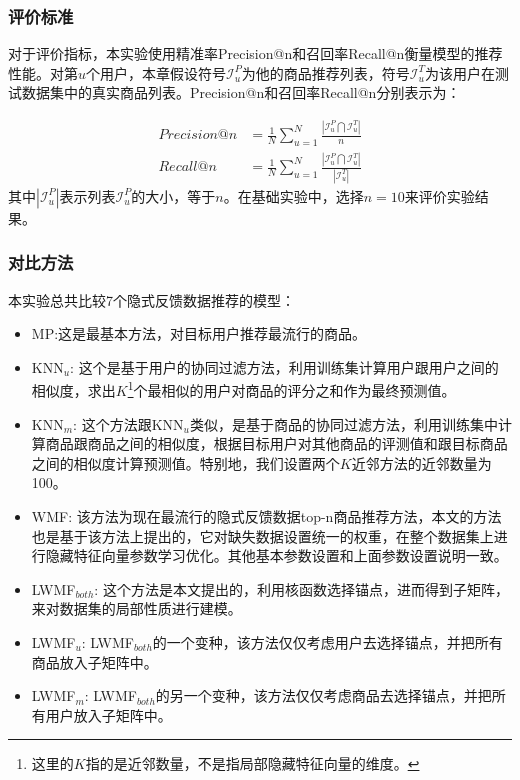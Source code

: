 \subsubsection{评价标准}
对于评价指标，本实验使用精准率Precision@n和召回率Recall@n衡量模型的推荐性能。对第$u$个用户，本章假设符号$\mathcal{I}^P_u$为他的商品推荐列表，符号$\mathcal{I}^T_u$为该用户在测试数据集中的真实商品列表。Precision@n和召回率Recall@n分别表示为：

\begin{align}
Precision@n &= \frac{1}{N}\sum_{u=1}^{N}\frac{|\mathcal{I}^P_u\bigcap \mathcal{I}^T_u|}{n}\\
Recall@n &= \frac{1}{N}\sum_{u=1}^{N}\frac{|\mathcal{I}^P_u\bigcap \mathcal{I}^T_u|}{|\mathcal{I}^T_u|}
\end{align}
其中$|\mathcal{I}^P_u|$表示列表$\mathcal{I}^P_u$的大小，等于$n$。在基础实验中，选择$n=10$来评价实验结果。

\subsubsection{对比方法}
本实验总共比较7个隐式反馈数据推荐的模型：
\begin{itemize}
	\item MP:这是最基本方法，对目标用户推荐最流行的商品。 
	\item KNN$_u$: 这个是基于用户的协同过滤方法，利用训练集计算用户跟用户之间的相似度，求出$K$\footnote{这里的$K$指的是近邻数量，不是指局部隐藏特征向量的维度。}个最相似的用户对商品的评分之和作为最终预测值。
	\item KNN$_m$: 这个方法跟KNN$_u$类似，是基于商品的协同过滤方法，利用训练集中计算商品跟商品之间的相似度，根据目标用户对其他商品的评测值和跟目标商品之间的相似度计算预测值。特别地，我们设置两个$K$近邻方法的近邻数量为100。
	\item WMF: 该方法为现在最流行的隐式反馈数据top-n商品推荐方法\cite{hu2008collaborative,he2016fast}，本文的方法也是基于该方法上提出的，它对缺失数据设置统一的权重，在整个数据集上进行隐藏特征向量参数学习优化。其他基本参数设置和上面参数设置说明一致。
	\item LWMF$_{both}$: 这个方法是本文提出的，利用核函数选择锚点，进而得到子矩阵，来对数据集的局部性质进行建模。
	\item LWMF$_u$: LWMF$_{both}$的一个变种，该方法仅仅考虑用户去选择锚点，并把所有商品放入子矩阵中。
	\item LWMF$_m$:  LWMF$_{both}$的另一个变种，该方法仅仅考虑商品去选择锚点，并把所有用户放入子矩阵中。
\end{itemize}

